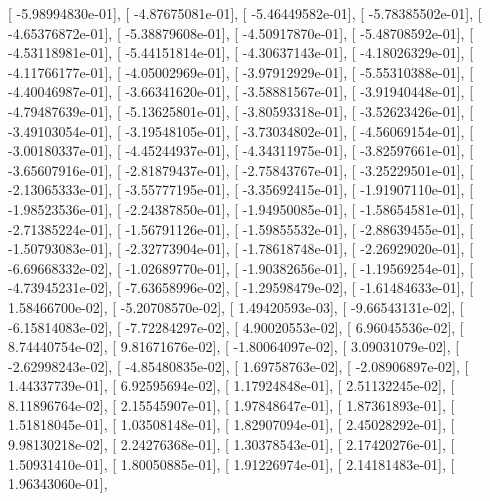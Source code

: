 \documentclass{article}
\begin{document}
       [ -5.98994830e-01],
       [ -4.87675081e-01],
       [ -5.46449582e-01],
       [ -5.78385502e-01],
       [ -4.65376872e-01],
       [ -5.38879608e-01],
       [ -4.50917870e-01],
       [ -5.48708592e-01],
       [ -4.53118981e-01],
       [ -5.44151814e-01],
       [ -4.30637143e-01],
       [ -4.18026329e-01],
       [ -4.11766177e-01],
       [ -4.05002969e-01],
       [ -3.97912929e-01],
       [ -5.55310388e-01],
       [ -4.40046987e-01],
       [ -3.66341620e-01],
       [ -3.58881567e-01],
       [ -3.91940448e-01],
       [ -4.79487639e-01],
       [ -5.13625801e-01],
       [ -3.80593318e-01],
       [ -3.52623426e-01],
       [ -3.49103054e-01],
       [ -3.19548105e-01],
       [ -3.73034802e-01],
       [ -4.56069154e-01],
       [ -3.00180337e-01],
       [ -4.45244937e-01],
       [ -4.34311975e-01],
       [ -3.82597661e-01],
       [ -3.65607916e-01],
       [ -2.81879437e-01],
       [ -2.75843767e-01],
       [ -3.25229501e-01],
       [ -2.13065333e-01],
       [ -3.55777195e-01],
       [ -3.35692415e-01],
       [ -1.91907110e-01],
       [ -1.98523536e-01],
       [ -2.24387850e-01],
       [ -1.94950085e-01],
       [ -1.58654581e-01],
       [ -2.71385224e-01],
       [ -1.56791126e-01],
       [ -1.59855532e-01],
       [ -2.88639455e-01],
       [ -1.50793083e-01],
       [ -2.32773904e-01],
       [ -1.78618748e-01],
       [ -2.26929020e-01],
       [ -6.69668332e-02],
       [ -1.02689770e-01],
       [ -1.90382656e-01],
       [ -1.19569254e-01],
       [ -4.73945231e-02],
       [ -7.63658996e-02],
       [ -1.29598479e-02],
       [ -1.61484633e-01],
       [  1.58466700e-02],
       [ -5.20708570e-02],
       [  1.49420593e-03],
       [ -9.66543131e-02],
       [ -6.15814083e-02],
       [ -7.72284297e-02],
       [  4.90020553e-02],
       [  6.96045536e-02],
       [  8.74440754e-02],
       [  9.81671676e-02],
       [ -1.80064097e-02],
       [  3.09031079e-02],
       [ -2.62998243e-02],
       [ -4.85480835e-02],
       [  1.69758763e-02],
       [ -2.08906897e-02],
       [  1.44337739e-01],
       [  6.92595694e-02],
       [  1.17924848e-01],
       [  2.51132245e-02],
       [  8.11896764e-02],
       [  2.15545907e-01],
       [  1.97848647e-01],
       [  1.87361893e-01],
       [  1.51818045e-01],
       [  1.03508148e-01],
       [  1.82907094e-01],
       [  2.45028292e-01],
       [  9.98130218e-02],
       [  2.24276368e-01],
       [  1.30378543e-01],
       [  2.17420276e-01],
       [  1.50931410e-01],
       [  1.80050885e-01],
       [  1.91226974e-01],
       [  2.14181483e-01],
       [  1.96343060e-01],
\end{document}
